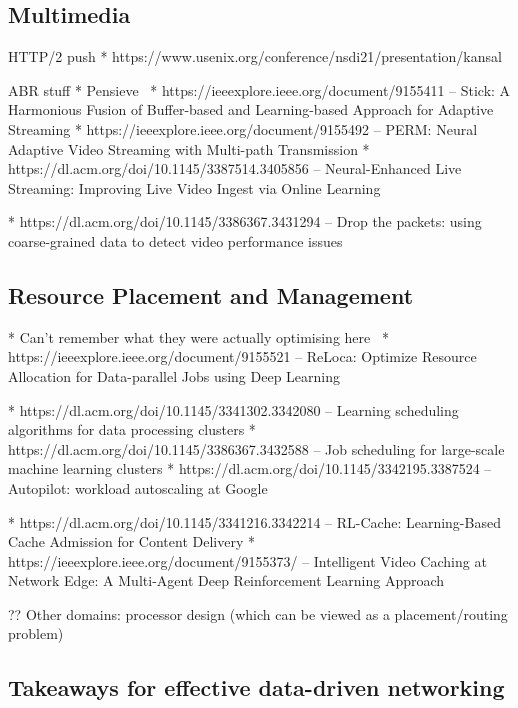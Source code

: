 \subsection{Multimedia}

HTTP/2 push
* https://www.usenix.org/conference/nsdi21/presentation/kansal

ABR stuff
* Pensieve~\parencite{DBLP:conf/sigcomm/MaoNA17}
* https://ieeexplore.ieee.org/document/9155411 -- Stick: A Harmonious Fusion of Buffer-based and Learning-based Approach for Adaptive Streaming
* https://ieeexplore.ieee.org/document/9155492 -- PERM: Neural Adaptive Video Streaming with Multi-path Transmission
* https://dl.acm.org/doi/10.1145/3387514.3405856 -- Neural-Enhanced Live Streaming: Improving Live Video Ingest via Online Learning

* https://dl.acm.org/doi/10.1145/3386367.3431294 -- Drop the packets: using coarse-grained data to detect video performance issues

\subsection{Resource Placement and Management}

* Can't remember what they were actually optimising here~\parencite{DBLP:conf/hotnets/MaoAMK16}
* https://ieeexplore.ieee.org/document/9155521 -- ReLoca: Optimize Resource Allocation for Data-parallel Jobs using Deep Learning

* https://dl.acm.org/doi/10.1145/3341302.3342080 -- Learning scheduling algorithms for data processing clusters
* https://dl.acm.org/doi/10.1145/3386367.3432588 -- Job scheduling for large-scale machine learning clusters
* https://dl.acm.org/doi/10.1145/3342195.3387524 -- Autopilot: workload autoscaling at Google

* https://dl.acm.org/doi/10.1145/3341216.3342214 -- RL-Cache: Learning-Based Cache Admission for Content Delivery
* https://ieeexplore.ieee.org/document/9155373/ -- Intelligent Video Caching at Network Edge: A Multi-Agent Deep Reinforcement Learning Approach

?? Other domains: processor design (which can be viewed as a placement/routing problem)~\parencite{Mirhoseini2021}

\subsection{Takeaways for effective data-driven networking}\label{sec:ddn-use-takeaways}

